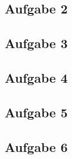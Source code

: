 \documentclass[12pt,a4paper]{article}
\begin{document}
\begin{multicols}{2}
\subsection{Aufgabe 2}
\subsection{Aufgabe 3}
\subsection{Aufgabe 4}
\subsection{Aufgabe 5}
\subsection{Aufgabe 6}


\end{multicols}
\end{document}
